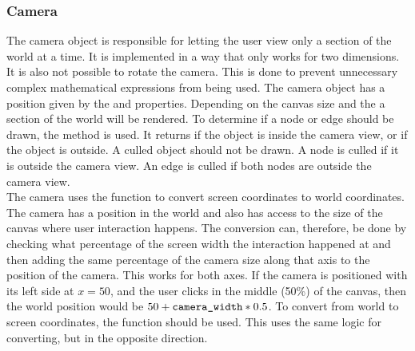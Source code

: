 \subsubsection{Camera}
The camera object is responsible for letting the user view only a section of the world at a time. It is implemented in a way that only works for two dimensions. It is also not possible to rotate the camera. This is done to prevent unnecessary complex mathematical expressions from being used. The camera object has a position given by the  and  properties. Depending on the canvas size and the  a section of the world will be rendered. To determine if a node or edge should be drawn, the  method is used. It returns  if the object is inside the camera view, or  if the object is outside. A culled object should not be drawn. A node is culled if it is outside the camera view. An edge is culled if both nodes are outside the camera view.
\\[11pt]
The camera uses the  function to convert screen coordinates to world coordinates. The camera has a position in the world and also has access to the size of the canvas where user interaction happens. The conversion can, therefore, be done by checking what percentage of the screen width the interaction happened at and then adding the same percentage of the camera size along that axis to the position of the camera. This works for both axes. If the camera is positioned with its left side at $x=50$, and the user clicks in the middle (50\%) of the canvas, then the world position would be $50 + \texttt{camera\_width} * 0.5$. To convert from world to screen coordinates, the  function should be used. This uses the same logic for converting, but in the opposite direction.
